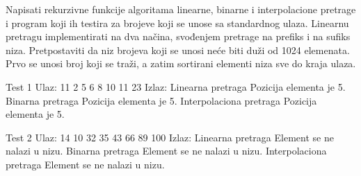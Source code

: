\begin{Exercise}[label=402]
  Napisati rekurzivne funkcije algoritama linearne, binarne i
  interpolacione pretrage i program koji ih testira za brojeve koji se
  unose sa standardnog ulaza. Linearnu pretragu implementirati na dva
  načina, svođenjem pretrage na prefiks i na sufiks
  niza. Pretpostaviti da niz brojeva koji se unosi neće biti duži od
  1024 elemenata. Prvo se unosi broj koji se traži, a zatim sortirani
  elementi niza sve do kraja ulaza.

\begin{miditest}
\begin{test}{Test 1}
Ulaz: 11 2 5 6 8 10 11 23
Izlaz:
  Linearna pretraga
  Pozicija elementa je 5.
  Binarna pretraga
  Pozicija elementa je 5.
  Interpolaciona pretraga
  Pozicija elementa je 5.
\end{test}
\end{miditest}
\begin{miditest}
\begin{test}{Test 2}
Ulaz: 14 10 32 35 43 66 89 100
Izlaz:
  Linearna pretraga
  Element se ne nalazi u nizu.
  Binarna pretraga
  Element se ne nalazi u nizu.
  Interpolaciona pretraga
  Element se ne nalazi u nizu.
\end{test}
\end{miditest}


\end{Exercise}


